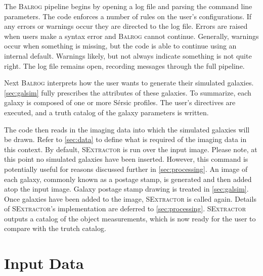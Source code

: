 \documentclass[12pt]{book}
\newcommand{\balrog}{\textsc{Balrog}}
\newcommand{\sex}{\textsc{SExtractor}}
\newcommand{\sersic}{S\'{e}rsic}
\begin{document}
The \balrog{}  pipeline begins by opening a log file and parsing the command line parameters.
The code enforces a number of rules on the user's configurations.
If any errors or warnings occur they are directed to the log file. 
Errors are raised when users make a syntax error and \balrog{} cannot continue.
Generally, warnings occur when something is missing, but the code is able to continue using an internal default. 
Warnings likely, but not always indicate something is not quite right.
The log file remains open, recording messages through the full pipeline.

Next \balrog{} interprets how the user wants to generate their simulated galaxies.
\autoref{sec:galsim} fully prescribes the attributes of these galaxies.
To summarize, each galaxy is composed of one or more \sersic{} profiles.
The user's directives are executed, and  a truth catalog of the galaxy parameters is written.

The code then reads in the imaging data into which the simulated galaxies will be drawn.
Refer to \autoref{sec:data} to define what is required of the imaging data in this context.
By default, \sex{} is run over the input image. Please note, at this point no simulated
galaxies have been inserted. However, this command is potentially useful
for reasons discussed further in \autoref{sec:processing}.
An image of each galaxy, commonly known as a postage stamp, is generated and then added atop the input image.
Galaxy postage stamp drawing is treated in \autoref{sec:galsim}.
Once galaxies have been added to the image, \sex{} is called again.
Details of \sex{}'s implementation are deferred to \autoref{sec:processing}.
\sex{} outputs a catalog of the object measurements, which is now ready
for the user to compare with the trutch catalog.


\section{Input Data}
\label{sec:data}
\end{document}
